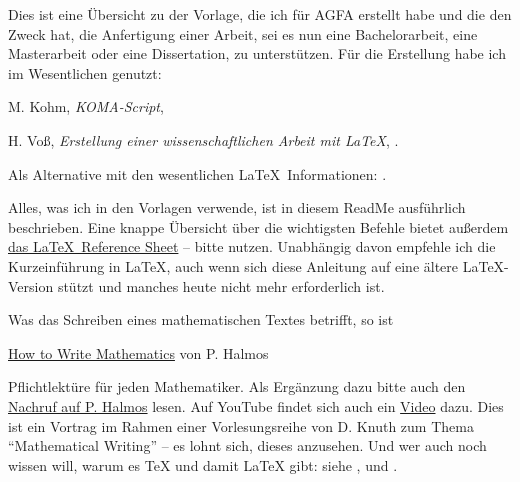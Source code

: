 \thispagestyle{empty}
Dies ist eine Übersicht zu der Vorlage, die ich für AGFA erstellt habe und die den Zweck hat, die Anfertigung einer Arbeit, sei es nun eine Bachelorarbeit, eine Masterarbeit oder eine Dissertation, zu unterstützen.
Für die Erstellung habe ich im Wesentlichen genutzt: 
%
\begin{myitemize}[nosep]
\item
M. Kohm, \emph{KOMA-Script}, \cite{kohm:2020}   

\item
H. Voß, \emph{Erstellung einer wissenschaftlichen Arbeit mit \LaTeX{}}, \cite{voss:2021}.

\item
Als Alternative mit den wesentlichen \LaTeX\ Informationen: \textcite{schlosser:2016}.

\end{myitemize}
%
Alles, was ich in den Vorlagen verwende, ist in diesem ReadMe ausführlich beschrieben.
Eine knappe Übersicht über die wichtigsten Befehle bietet außerdem \href{https://ctan.org/pkg/latex-refsheet}{das \LaTeX\ Reference Sheet} -- bitte nutzen.
Unabhängig davon empfehle ich die Kurzeinführung \textcite{lshort-german} in \LaTeX{}, auch wenn sich diese Anleitung auf eine ältere \LaTeX{}-Version stützt und manches heute nicht mehr erforderlich ist.

Was das Schreiben eines mathematischen Textes betrifft, so ist
\begin{myitemize}[nosep]
\item
\href{https://sites.math.washington.edu/~lind/Resources/Halmos.pdf}{How to Write Mathematics} von P. Halmos 
\end{myitemize}
%
Pflichtlektüre für jeden Mathematiker.
Als Ergänzung dazu bitte auch den \href{https://www.ams.org/notices/200709/tx070901136p.pdf}{Nachruf auf P. Halmos} lesen.
Auf YouTube findet sich auch ein \href{https://www.youtube.com/watch?v=Cy_1JgYfKmE}{Video} dazu.
Dies ist ein Vortrag im Rahmen einer Vorlesungsreihe von D. Knuth zum Thema \enquote{Mathematical Writing} -- es lohnt sich, dieses anzusehen.
Und wer auch noch wissen will, warum es \TeX{} und damit \LaTeX{} gibt: siehe \textcite{knuth:digital}, \textcite{beeton:math} und \textcite{lamport:dmv}.

